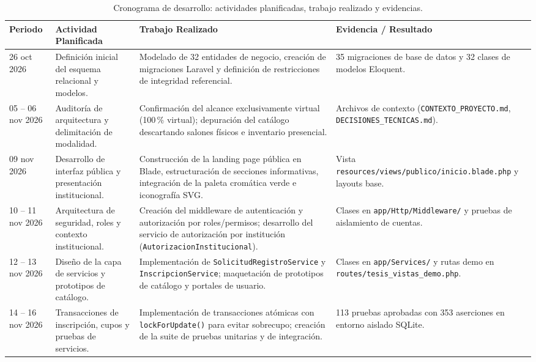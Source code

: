 \begin{table}[htbp]
\centering
\caption{Cronograma de desarrollo: actividades planificadas, trabajo realizado y evidencias.}
\label{tabla:cronograma_desarrollo}
\small
\begin{tabularx}{\textwidth}{|p{2.6cm}|p{3.8cm}|X|p{3.2cm}|}
\hline
\rowcolor[gray]{0.9}
\textbf{Periodo} & \textbf{Actividad Planificada} & \textbf{Trabajo Realizado} & \textbf{Evidencia / Resultado} \\
\hline
26 oct 2026 & Definición inicial del esquema relacional y modelos. & Modelado de 32 entidades de negocio, creación de migraciones Laravel y definición de restricciones de integridad referencial. & 35 migraciones de base de datos y 32 clases de modelos Eloquent. \\
\hline
05 -- 06 nov 2026 & Auditoría de arquitectura y delimitación de modalidad. & Confirmación del alcance exclusivamente virtual (100\,\% virtual); depuración del catálogo descartando salones físicos e inventario presencial. & Archivos de contexto (\texttt{CONTEXTO\_PROYECTO.md}, \texttt{DECISIONES\_TECNICAS.md}). \\
\hline
09 nov 2026 & Desarrollo de interfaz pública y presentación institucional. & Construcción de la landing page pública en Blade, estructuración de secciones informativas, integración de la paleta cromática verde e iconografía SVG. & Vista \texttt{resources/views/}\break\texttt{publico/inicio.blade.php} y layouts base. \\
\hline
10 -- 11 nov 2026 & Arquitectura de seguridad, roles y contexto institucional. & Creación del middleware de autenticación y autorización por roles/permisos; desarrollo del servicio de autorización por institución (\texttt{AutorizacionInstitucional}). & Clases en \texttt{app/Http/}\break\texttt{Middleware/} y pruebas de aislamiento de cuentas. \\
\hline
12 -- 13 nov 2026 & Diseño de la capa de servicios y prototipos de catálogo. & Implementación de \texttt{SolicitudRegistroService} y \texttt{InscripcionService}; maquetación de prototipos de catálogo y portales de usuario. & Clases en \texttt{app/Services/} y rutas demo en \texttt{routes/}\break\texttt{tesis\_vistas\_demo.php}. \\
\hline
14 -- 16 nov 2026 & Transacciones de inscripción, cupos y pruebas de servicios. & Implementación de transacciones atómicas con \texttt{lockForUpdate()} para evitar sobrecupo; creación de la suite de pruebas unitarias y de integración. & 113 pruebas aprobadas con 353 aserciones en entorno aislado SQLite. \\

\end{tabularx}
\end{table}
